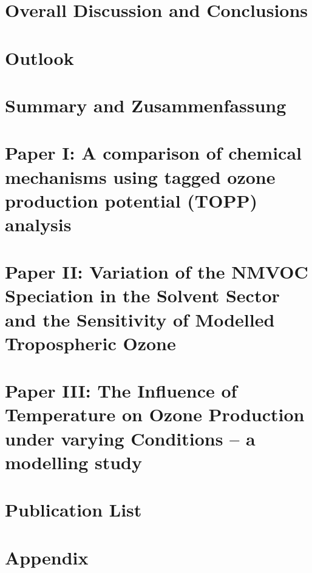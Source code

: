 \documentclass[12pt,twoside,openright,a4paper]{report}
\begin{document}
\chapter{Overall Discussion and Conclusions} \label{c:conclusions}

\clearpage{\pagestyle{empty}\cleardoublepage}

\chapter{Outlook} \label{c:outlook}

\clearpage{\pagestyle{empty}\cleardoublepage}

\chapter{Summary and Zusammenfassung} \label{c:summary}

\clearpage{\pagestyle{empty}\cleardoublepage}


 
\clearpage{\pagestyle{empty}\cleardoublepage}

\chapter{Paper I: A comparison of chemical mechanisms using tagged ozone production potential (TOPP) analysis} \label{c:paper_1}
\clearpage{\pagestyle{empty}\cleardoublepage}



\chapter{Paper II: Variation of the NMVOC Speciation in the Solvent Sector and the Sensitivity of Modelled Tropospheric Ozone} \label{c:paper_2}
\clearpage{\pagestyle{empty}\cleardoublepage}



\chapter{Paper III: The Influence of Temperature on Ozone Production under varying  Conditions -- a modelling study} \label{c:paper_3}
\clearpage{\pagestyle{empty}\cleardoublepage}

\chapter{Publication List}

\clearpage{\pagestyle{empty}\cleardoublepage}

\chapter*{Appendix}

\clearpage{\pagestyle{empty}\cleardoublepage}
\end{document}
